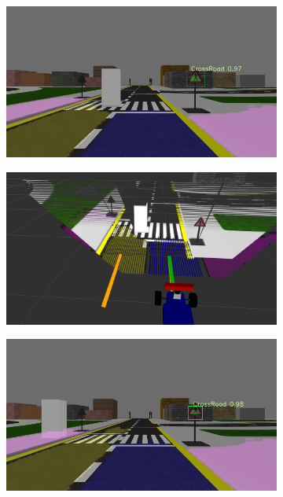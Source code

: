 \begin{figure}[h]
  \centering
  \begin{subfigure}[b]{0.45\linewidth}
    \includegraphics[width=\linewidth]{figures/experiments/cross-road-stop-img.png}
  \end{subfigure}
  \begin{subfigure}[b]{0.45\linewidth}
    \includegraphics[width=\linewidth]{figures/experiments/cross-road-stop-pc.png}
  \end{subfigure}
  \begin{subfigure}[b]{0.45\linewidth}
    \includegraphics[width=\linewidth]{figures/experiments/cross-road-go-img.png}

\end{subfigure}
\end{figure}
